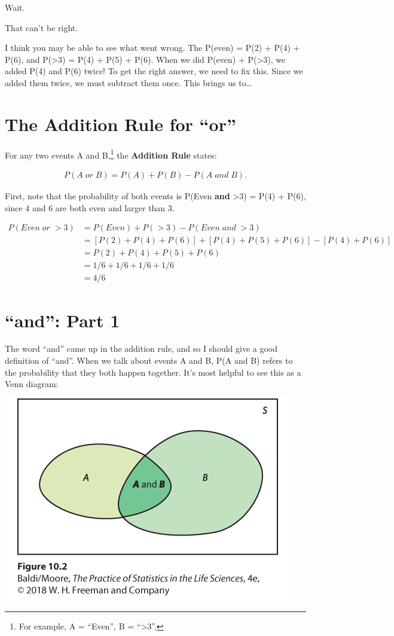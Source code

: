 \documentclass[
  letterpaper,
  DIV=11,
  numbers=noendperiod]{scrreprt}
\begin{document}
Wait.

That can't be right.

I think you may be able to see what went wrong. The P(even) = P(2) +
P(4) + P(6), and P(\textgreater3) = P(4) + P(5) + P(6). When we did
P(even) + P(\textgreater3), we added P(4) and P(6) twice! To get the
right answer, we need to fix this. Since we added them twice, we must
subtract them once. This brings us to\ldots{}

\hypertarget{the-addition-rule-for-or}{%
\section{The Addition Rule for ``or''}\label{the-addition-rule-for-or}}

For any two events A and B,\footnote{For example, A = ``Even'', B =
  ``\textgreater3''.} the \textbf{Addition Rule} states:

\begin{align}P(A\; or\; B) = P(A) + P(B) - P(A\; and\; B).\end{align}

First, note that the probability of both events is P(Even \textbf{and}
\textgreater3) = P(4) + P(6), since 4 and 6 are both even and larger
than 3.

\begin{align*}
 P(Even\; or\; >3) & = P(Even) + P(>3) - P(Even\; and\; >3)\\
& = [P(2) + P(4) + P(6)] + [P(4) + P(5) + P(6)] - [P(4) + P(6)]\\
& =  P(2) + P(4) + P(5) + P(6)\\
& = 1/6 + 1/6 + 1/6 + 1/6\\
& = 4/6
\end{align*} \normalsize

\hypertarget{and-part-1}{%
\section{``and'': Part 1}\label{and-part-1}}

The word ``and'' came up in the addition rule, and so I should give a
good definition of ``and''. When we talk about events A and B, P(A and
B) refers to the probability that they both happen together. It's most
helpful to see this as a Venn diagram:

\includegraphics{figs/Venn1.png}
\end{document}
